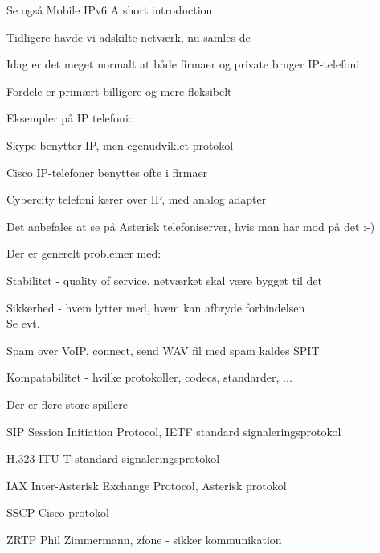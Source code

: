 

Se også Mobile IPv6 A short introduction 



\begin{list1}
\item Tidligere havde vi adskilte netværk, nu samles de 
\item Idag er det meget normalt at både firmaer og private bruger IP-telefoni
\item Fordele er primært billigere og mere fleksibelt
\item Eksempler på IP telefoni:
\begin{list2}
\item Skype benytter IP, men egenudviklet protokol
\item Cisco IP-telefoner benyttes ofte i firmaer
\item Cybercity telefoni kører over IP, med analog adapter
\end{list2}
\item Det anbefales at se på Asterisk telefoniserver, hvis man har mod på det :-)
\item {}
\end{list1}


\begin{list1}
\item Der er generelt problemer med:
\begin{list2}
\item Stabilitet - quality of service, netværket skal være bygget til det
\item Sikkerhed - hvem lytter med, hvem kan afbryde forbindelsen\\
Se evt. 
\item Spam over VoIP, connect, send WAV fil med spam kaldes SPIT
\item Kompatabilitet - hvilke protokoller, codecs, standarder, ...
\end{list2}
\item Der er flere store spillere
\end{list1}


\begin{list1}
\item SIP Session Initiation Protocol, IETF standard signaleringsprotokol
\item H.323 ITU-T standard signaleringsprotokol
\item IAX Inter-Asterisk Exchange Protocol, Asterisk protokol
\item SSCP Cisco protokol
\item ZRTP Phil Zimmermann, zfone - sikker kommunikation\\ 
\end{list1}